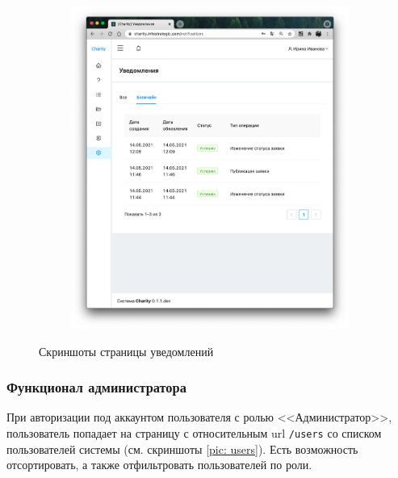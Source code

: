 \documentclass[a4paper,12pt,reqno]{article}
\begin{document}
	\begin{figure}[H]
		\centering
		\begin{subfigure}[b]{0.475\linewidth}
			\includegraphics[width=\linewidth]{img/ro/notifications_blockckain.png}
		\end{subfigure}
		\caption{Скриншоты страницы уведомлений}
		\label{pic: notifications}
	\end{figure}
	
	\subsubsection{Функционал администратора}
	
	При авторизации под аккаунтом пользователя с ролью <<Администратор>>, пользователь попадает на страницу с относительным url \texttt{/users} со списком пользователей системы (см. скриншоты \ref{pic: users}). Есть возможность отсортировать, а также отфильтровать пользователей по роли.
	
\end{document}
